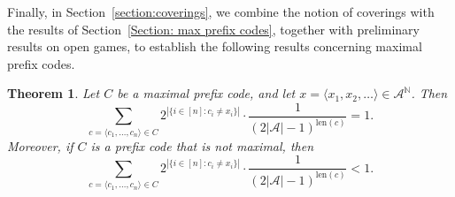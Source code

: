\documentclass[a4,12pt]{article}%
\newtheorem{theorem}{Theorem}[section]
\begin{document}
\medskip

Finally, in Section~\ref{section:coverings}, we combine the notion of coverings with the results of Section~\ref{Section: max prefix codes}, together with preliminary results on open games, to establish the following results concerning maximal prefix codes.

\begin{theorem} \label{main result: max prefix code ineq}
Let $C$ be a maximal prefix code, and let $x = \langle x_1,x_2,\dots\rangle\in \mathcal{A}^{\mathbb{N}}$. Then
\[
\sum_{c = \langle c_1, \ldots, c_n \rangle \in C}
2^{|\{ i \in [n] : c_i \neq x_i \}|}
\cdot \frac{1}{(2|\mathcal{A}| - 1)^{\mathrm{len}(c)}} = 1.
\]
Moreover, if $C$ is a prefix code that is not maximal, then
\[
\sum_{c = \langle c_1, \ldots, c_n \rangle \in C}
2^{|\{ i \in [n] : c_i \neq x_i \}|}
\cdot \frac{1}{(2|\mathcal{A}| - 1)^{\mathrm{len}(c)}} < 1.
\]
\end{theorem}
 
\end{document}
